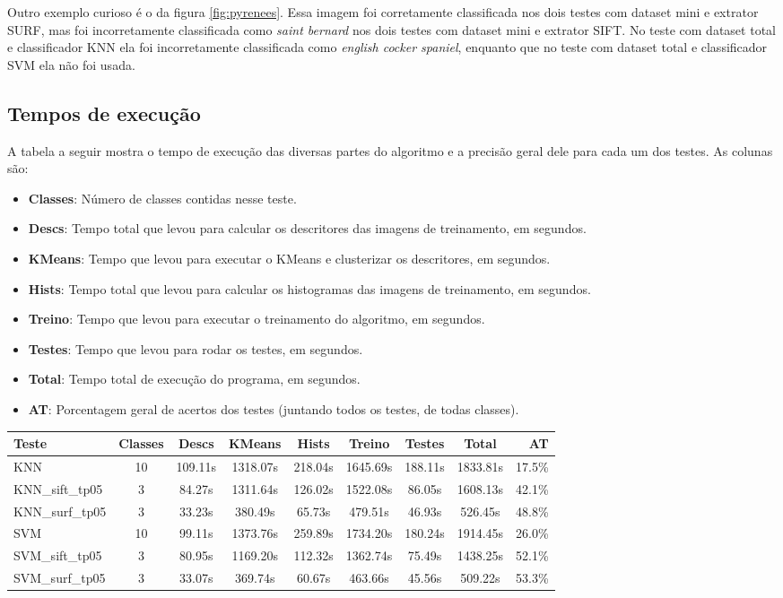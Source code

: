 Outro exemplo curioso é o da figura \ref{fig:pyrenees}. Essa imagem foi corretamente classificada nos dois testes
com dataset mini e extrator SURF, mas foi incorretamente classificada como \textit{saint bernard} nos dois testes
com dataset mini e extrator SIFT. No teste com dataset total e classificador KNN ela foi incorretamente classificada 
como \textit{english cocker spaniel}, enquanto que no teste com dataset total e classificador SVM ela não foi usada.

\subsection{Tempos de execução}
A tabela a seguir mostra o tempo de execução das diversas partes do algoritmo e a
precisão geral dele para cada um dos testes. As colunas são:
\begin{itemize}
  \item \textbf{Classes}: Número de classes contidas nesse teste.
  \item \textbf{Descs}: Tempo total que levou para calcular os descritores das imagens de treinamento, em segundos.
  \item \textbf{KMeans}: Tempo que levou para executar o KMeans e clusterizar os descritores, em segundos.
  \item \textbf{Hists}: Tempo total que levou para calcular os histogramas das imagens de treinamento, em segundos.
  \item \textbf{Treino}: Tempo que levou para executar o treinamento do algoritmo, em segundos.
  \item \textbf{Testes}: Tempo que levou para rodar os testes, em segundos.
  \item \textbf{Total}: Tempo total de execução do programa, em segundos.
  \item \textbf{AT}: Porcentagem geral de acertos dos testes (juntando todos os testes, de todas classes).
\end{itemize}
\begin{tabular}{ | l | c | c | c | c | c | c | c | r | }
\hline
Teste       & Classes & Descs & KMeans & Hists & Treino & Testes & Total & AT \\
\hline
KNN & 10 & 109.11s & 1318.07s & 218.04s & 1645.69s & 188.11s & 1833.81s & 17.5\% \\
\hline
KNN\_sift\_tp05 & 3 & 84.27s & 1311.64s & 126.02s & 1522.08s & 86.05s & 1608.13s & 42.1\% \\
\hline
KNN\_surf\_tp05 & 3 & 33.23s & 380.49s & 65.73s & 479.51s & 46.93s & 526.45s & 48.8\% \\
\hline
SVM & 10 & 99.11s & 1373.76s & 259.89s & 1734.20s & 180.24s & 1914.45s & 26.0\% \\
\hline
SVM\_sift\_tp05 & 3 & 80.95s & 1169.20s & 112.32s & 1362.74s & 75.49s & 1438.25s & 52.1\% \\
\hline
SVM\_surf\_tp05 & 3 & 33.07s & 369.74s & 60.67s & 463.66s & 45.56s & 509.22s & 53.3\% \\
\hline
\end{tabular}

